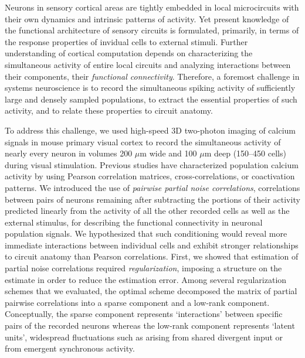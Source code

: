 Neurons in sensory cortical areas are tightly embedded in local microcircuits with their own dynamics and intrinsic patterns of activity.  
Yet present knowledge of the functional architecture of sensory circuits is formulated, primarily, in terms of the response properties of invidual cells to external stimuli.
Further understanding of cortical computation depends on characterizing the simultaneous activity of entire local circuits and analyzing interactions between their components, \ie their \emph{functional connectivity}.
Therefore, a foremost challenge in systems neuroscience is to record the simultaneous spiking activity of sufficiently large and densely sampled populations, to extract the essential properties of such activity, and to relate these properties to circuit anatomy. 

To address this challenge, we used high-speed 3D two-photon imaging of calcium signals in mouse primary visual cortex to record the simultaneous activity of nearly every neuron in volumes 200 $\mu$m wide and 100 $\mu$m deep (150--450 cells) during visual stimulation. 
Previous studies have characterized population calcium activity by using Pearson correlation matrices, cross-correlations, or coactivation patterns.  
We introduced the use of \emph{pairwise partial noise correlations}, \ie correlations between pairs of neurons remaining after subtracting the portions of their activity predicted linearly from the activity of all the other recorded cells as well as the external stimulus, for describing the functional connectivity in neuronal population signals. 
We hypothesized that such conditioning would reveal more immediate interactions between individual cells and exhibit stronger relationships to circuit anatomy than Pearson correlations.
First, we showed that estimation of partial noise correlations required \emph{regularization}, \ie imposing a structure on the estimate in order to reduce the estimation error. 
Among several regularization schemes that we evaluated, the optimal scheme decomposed the matrix of partial pairwise correlations into a sparse component and a low-rank component. 
Conceptually, the sparse component represents `interactions' between specific pairs of the recorded neurons whereas the low-rank component represents `latent units', \ie widespread fluctuations such as arising from shared divergent input or from emergent synchronous activity.

